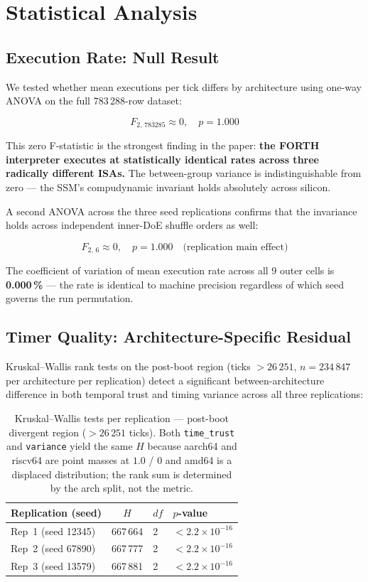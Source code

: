 \documentclass[10pt,a4paper]{article}
\begin{document}
\section{Statistical Analysis}
\label{sec:stats}

\subsection{Execution Rate: Null Result}

We tested whether mean executions per tick differs by architecture using
one-way ANOVA on the full 783\,288-row dataset:

\[
  F_{2,\,783285} \approx 0, \quad p = 1.000
\]

This zero F-statistic is the strongest finding in the paper:
\textbf{the FORTH interpreter executes at statistically identical rates
across three radically different ISAs.}  The between-group variance is
indistinguishable from zero --- the SSM's compudynamic invariant holds
absolutely across silicon.

A second ANOVA across the three seed replications confirms that the
invariance holds across independent inner-DoE shuffle orders as well:

\[
  F_{2,\,6} \approx 0, \quad p = 1.000 \quad \text{(replication main effect)}
\]

The coefficient of variation of mean execution rate across all 9 outer cells
is \textbf{0.000\,\%} --- the rate is identical to machine precision regardless
of which seed governs the run permutation.

\subsection{Timer Quality: Architecture-Specific Residual}

Kruskal--Wallis rank tests on the post-boot region (ticks $> 26\,251$,
$n = 234\,847$ per architecture per replication) detect a significant
between-architecture difference in both temporal trust and timing variance
across all three replications:

\begin{table}[h!]
\centering
\caption{Kruskal--Wallis tests per replication --- post-boot divergent region ($> 26\,251$ ticks).
  Both \texttt{time\_trust} and \texttt{variance} yield the same $H$ because
  aarch64 and riscv64 are point masses at $1.0$ / $0$ and amd64 is a displaced
  distribution; the rank sum is determined by the arch split, not the metric.}
\label{tab:kw}
\begin{tabular}{lSll}
\toprule
Replication (seed) & {$H$} & {$df$} & {$p$-value} \\
\midrule
Rep~1 (seed 12345) & 667\,664 & 2 & $< 2.2 \times 10^{-16}$ \\
Rep~2 (seed 67890) & 667\,777 & 2 & $< 2.2 \times 10^{-16}$ \\
Rep~3 (seed 13579) & 667\,881 & 2 & $< 2.2 \times 10^{-16}$ \\
\bottomrule
\end{tabular}
\end{table}
\end{document}

